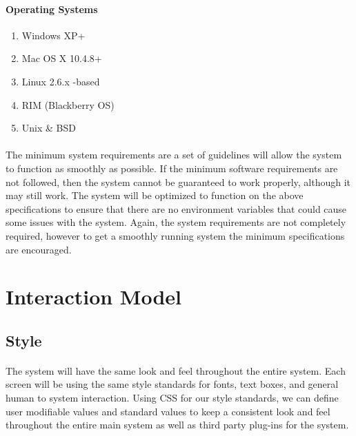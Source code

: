 \documentclass[letterpaper,12pt]{report}
\begin{document}
\paragraph{Operating Systems}
\begin{enumerate}
 \item Windows XP+
 \item Mac OS X 10.4.8+
 \item Linux 2.6.x -based
 \item RIM (Blackberry OS)
 \item Unix \& BSD
\end{enumerate}


\paragraph*{}\hspace{0.6cm}The minimum system requirements are a set of guidelines will allow the system to function as smoothly as possible. If the minimum software requirements are not followed, then the system cannot be guaranteed to work properly, although it may still work. The system will be optimized to function on the above specifications to ensure that there are no environment variables that could cause some issues with the system. Again, the system requirements are not completely required, however to get a smoothly running system the minimum specifications are encouraged. 



\pagebreak
\section{Interaction Model}
\subsection{Style}
\paragraph*{}\hspace{0.6cm}The system will have the same look and feel throughout the entire system. Each screen will be using the same style standards for fonts, text boxes, and general human to system interaction. Using CSS for our style standards, we can define user modifiable values and standard values to keep a consistent look and feel throughout the entire main system as well as third party plug-ins for the system.
\end{document}
